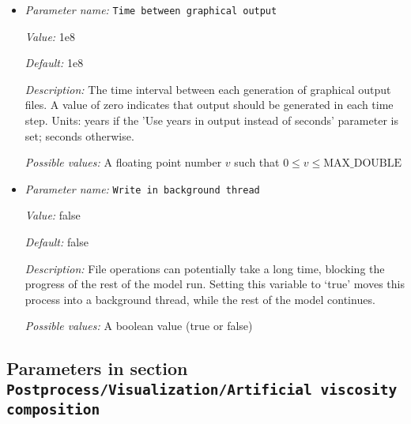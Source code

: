 \begin{itemize}
{\it Default:} 


{\it Description:} On large clusters it can be advantageous to first write the output to a temporary file on a local file system and later move this file to a network file system. If this variable is set to a non-empty string it will be interpreted as a temporary storage location.


{\it Possible values:} Any string
\item {\it Parameter name:} {\tt Time between graphical output}
\label{parameters:Postprocess/Visualization/Time between graphical output}


{\it Value:} 1e8


{\it Default:} 1e8


{\it Description:} The time interval between each generation of graphical output files. A value of zero indicates that output should be generated in each time step. Units: years if the 'Use years in output instead of seconds' parameter is set; seconds otherwise.


{\it Possible values:} A floating point number $v$ such that $0 \leq v \leq \text{MAX\_DOUBLE}$
\item {\it Parameter name:} {\tt Write in background thread}
\label{parameters:Postprocess/Visualization/Write in background thread}


{\it Value:} false


{\it Default:} false


{\it Description:} File operations can potentially take a long time, blocking the progress of the rest of the model run. Setting this variable to `true' moves this process into a background thread, while the rest of the model continues.


{\it Possible values:} A boolean value (true or false)
\end{itemize}



\subsection{Parameters in section \tt Postprocess/Visualization/Artificial viscosity composition}
\label{parameters:Postprocess/Visualization/Artificial_20viscosity_20composition}

